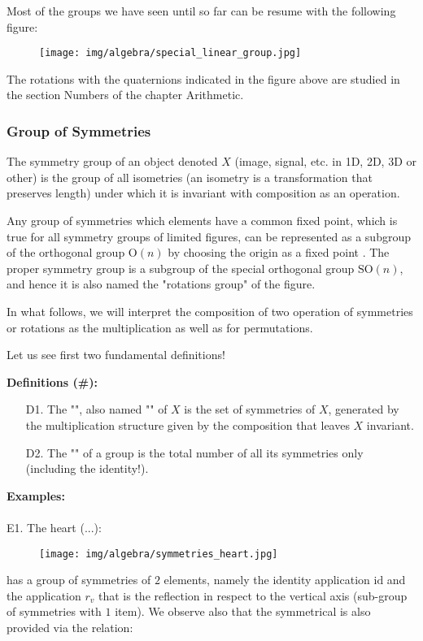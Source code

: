 	Most of the groups we have seen until so far can be resume with the following figure:
	\begin{figure}[H]
		\centering
		\texttt{[image: img/algebra/special\_linear\_group.jpg]}
	\end{figure}
	The rotations with the quaternions indicated in the figure above are studied in the section Numbers of the chapter Arithmetic.
	
	\pagebreak
	\subsubsection{Group of Symmetries}
	The symmetry group of an object denoted $X$ (image, signal, etc. in 1D, 2D, 3D or other) is the group of all isometries (an isometry is a transformation that preserves length) under which it is invariant with composition as an operation.
	
	Any group of symmetries which elements have a common fixed point, which is true for all symmetry groups of limited figures, can be represented as a subgroup of the orthogonal group $\text{O} (n)$ by choosing the origin as a fixed point . The proper symmetry group is a subgroup of the special orthogonal group $\text{SO} (n)$, and hence it is also named the "rotations group" of the figure.
	
	In what follows, we will interpret the composition of two operation of symmetries  or rotations as the multiplication as well as for permutations.
	
	Let us see first two fundamental definitions!
	
	\textbf{Definitions (\#\mydef):}
	\begin{enumerate}
		\item[D1.] The "", also named "" of $X$ is the set of symmetries of $X$, generated by the multiplication structure given by the composition that leaves $X$ invariant.
		
		\item[D2.] The "" of a group is the total number of all its symmetries only (including the identity!).
	\end{enumerate}
	\begin{tcolorbox}[colframe=black,colback=white,sharp corners]
	\textbf{{\Large {}}Examples:}\\\\
	E1. The heart (...):
	\begin{figure}[H]
		\centering
		\texttt{[image: img/algebra/symmetries\_heart.jpg]}
	\end{figure}
	has a group of symmetries of $2$ elements, namely the identity application $\text{id}$ and the application $r_v$ that is the reflection in respect to the vertical axis (sub-group of symmetries with $1$ item). We observe also that the symmetrical is also provided via the relation:
	
	\end{tcolorbox}
	
